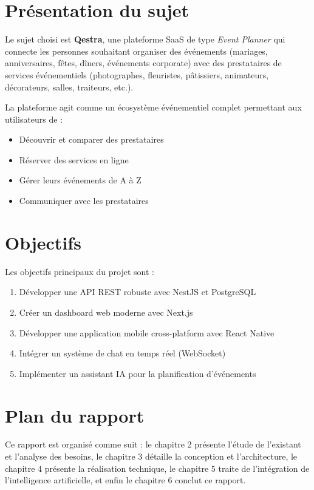 \documentclass[12pt,a4paper]{report}
\begin{document}
\section{Présentation du sujet}
Le sujet choisi est \textbf{Qestra}, une plateforme SaaS de type \textit{Event Planner} qui connecte les personnes souhaitant organiser des événements (mariages, anniversaires, fêtes, dîners, événements corporate) avec des prestataires de services événementiels (photographes, fleuristes, pâtissiers, animateurs, décorateurs, salles, traiteurs, etc.).

La plateforme agit comme un écosystème événementiel complet permettant aux utilisateurs de :
\begin{itemize}
  \item Découvrir et comparer des prestataires
  \item Réserver des services en ligne
  \item Gérer leurs événements de A à Z
  \item Communiquer avec les prestataires
\end{itemize}

\section{Objectifs}
Les objectifs principaux du projet sont :
\begin{enumerate}
  \item Développer une API REST robuste avec NestJS et PostgreSQL
  \item Créer un dashboard web moderne avec Next.js
  \item Développer une application mobile cross-platform avec React Native
  \item Intégrer un système de chat en temps réel (WebSocket)
  \item Implémenter un assistant IA pour la planification d'événements
\end{enumerate}

\section{Plan du rapport}
Ce rapport est organisé comme suit : le chapitre 2 présente l'étude de l'existant et l'analyse des besoins, le chapitre 3 détaille la conception et l'architecture, le chapitre 4 présente la réalisation technique, le chapitre 5 traite de l'intégration de l'intelligence artificielle, et enfin le chapitre 6 conclut ce rapport.
\end{document}
